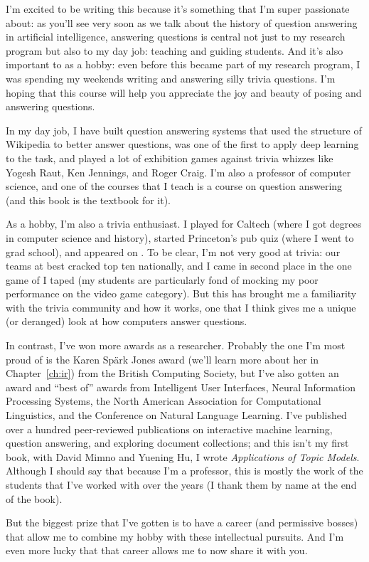 I’m excited to be writing this because it’s something that I’m super
passionate about: as you’ll see very soon as we talk about the history of
question answering in artificial intelligence, answering questions is central
not just to my research program but also to my day job: teaching and guiding
students.  And it’s also important to as a hobby: even before this became part
of my research program, I was spending my weekends writing and answering silly
trivia questions.  I’m hoping that this course will help you appreciate the
joy and beauty of posing and answering questions.

In my day job, I have built question answering systems that used the structure
of Wikipedia to better answer questions, was one of the first to apply deep
learning to the  task, and played a lot of exhibition games against
trivia whizzes like Yogesh Raut, Ken Jennings, and Roger Craig.  I'm also a
professor of computer science, and one of the courses that I teach is a
course on question answering (and this book is the textbook for it).

As a hobby, I'm also a trivia enthusiast.  I played \qb{} for Caltech (where I
got  degrees in computer science and history), started Princeton's pub
quiz (where I went to grad school), and appeared on \jeopardy{}.
%
To be clear, I'm not very good at trivia: our \qb{} teams at best cracked top
ten nationally, and I came in second place in the one game of \jeopardy{} I
taped (my students are particularly fond of mocking my poor performance on the
video game category).
%
But this has brought me a familiarity with the trivia community and how it
works, one that I think gives me a unique (or deranged) look at how computers
answer questions.

In contrast, I've won more awards as a researcher.
%
Probably the one I'm most proud of is the Karen Sp\"ark Jones award (we'll
learn more about her in Chapter~\ref{ch:ir}) from the British Computing Society,
but I've also gotten an  award and ``best of'' awards from Intelligent User
Interfaces, Neural Information Processing Systems, the North American
Association for Computational Linguistics, and the Conference on Natural
Language Learning.
%
I've published over a hundred peer-reviewed publications on interactive
machine learning, question answering, and exploring document collections; and
this isn't my first book, with David Mimno and Yuening Hu, I wrote
\emph{Applications of Topic Models}.
%
Although I should say that because I'm a professor, this is mostly the work of
the students that I've worked with over the years (I thank them by name at the
end of the book).

But the biggest prize that I've gotten is to have a career (and permissive
bosses) that allow me to combine my hobby with these intellectual pursuits.
%
And I'm even more lucky that that career allows me to now share it with you.

